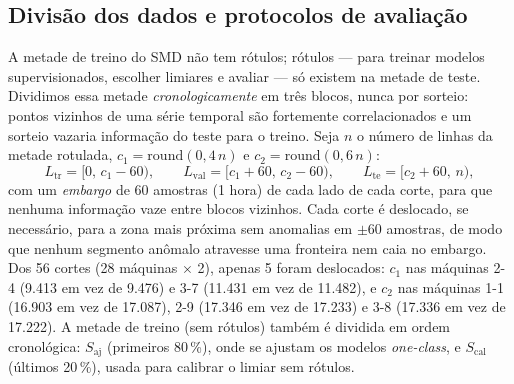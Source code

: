 \subsection{Divisão dos dados e protocolos de avaliação}\label{sec:divisao}
A metade de treino do SMD não tem rótulos; rótulos --- para treinar modelos supervisionados, escolher
limiares e avaliar --- só existem na metade de teste. Dividimos essa metade \emph{cronologicamente} em três
blocos, nunca por sorteio: pontos vizinhos de uma série temporal são fortemente correlacionados e um sorteio
vazaria informação do teste para o treino. Seja $n$ o número de linhas da metade rotulada,
$c_1=\mathrm{round}(0{,}4\,n)$ e $c_2=\mathrm{round}(0{,}6\,n)$:
\begin{equation}\label{eq:blocos}
L_{\mathrm{tr}}=[0,\,c_1-60),\qquad L_{\mathrm{val}}=[c_1+60,\,c_2-60),\qquad L_{\mathrm{te}}=[c_2+60,\,n),
\end{equation}
com um \emph{embargo} de 60 amostras (1 hora) de cada lado de cada corte, para que nenhuma informação vaze
entre blocos vizinhos. Cada corte é deslocado, se necessário, para a zona mais próxima sem anomalias em
$\pm60$ amostras, de modo que nenhum segmento anômalo atravesse uma fronteira nem caia no embargo. Dos 56
cortes (28 máquinas $\times$ 2), apenas 5 foram deslocados: $c_1$ nas máquinas 2-4 (9.413 em vez de 9.476) e
3-7 (11.431 em vez de 11.482), e $c_2$ nas máquinas 1-1 (16.903 em vez de 17.087), 2-9 (17.346 em vez de 17.233)
e 3-8 (17.336 em vez de 17.222). A metade de treino (sem rótulos) também é dividida em ordem cronológica:
$S_{\mathrm{aj}}$ (primeiros 80\,\%), onde se ajustam os modelos \emph{one-class}, e $S_{\mathrm{cal}}$ (últimos
20\,\%), usada para calibrar o limiar sem rótulos.

